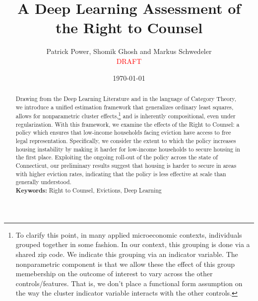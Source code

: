 \documentclass[a4paper,12pt]{article}
\begin{document}
\begin{titlepage}
\title{A Deep Learning Assessment of the Right to Counsel}

\author{Patrick Power, Shomik Ghosh and Markus Schwedeler \\ 
\textcolor{red}{DRAFT}}
\date{\today}
\maketitle
\thispagestyle{empty} %
\vspace{-2em}
\begin{abstract}
Drawing from the Deep Learning Literature and in the language of Category Theory, we introduce a unified estimation framework that generalizes ordinary least squares, allows for nonparametric cluster effects,\footnote{To clarify this point, in many applied microeconomic contexts, individuals grouped together in some fashion. In our context, this grouping is done via a shared zip code. We indicate this grouping via an indicator variable. The nonparametric component is that we allow these the effect of this group memebership on the outcome of interest to vary across the other controls/features. That is, we don't place a functional form assumption on the way the cluster indicator variable interacts with the other controls.} and is inherently compositional, even under regularization. With this framework, we examine the effects of the Right to Counsel: a policy which ensures that low-income households facing eviction have access to free legal representation. Specifically, we consider the extent to which the policy increases housing instability by making it harder for low-income households to secure housing in the first place. Exploiting the ongoing roll-out of the policy across the state of Connecticut, our preliminary results suggest that housing is harder to secure in areas with higher eviction rates, indicating that the policy is less effective at scale than generally understood. 
\vspace{0.2in}\\
\noindent\textbf{Keywords:} Right to Counsel, Evictions, Deep Learning\\
\end{abstract}
\setcounter{page}{1}
\end{titlepage}

\end{document}
